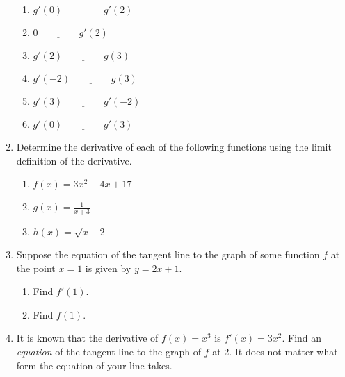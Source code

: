 \documentclass[11pt]{article}
\theoremstyle{definition}
\theoremstyle{definition}
\newcommand{\blank}{\underline{\ \ \ \ \ \ \ \ \ \ \ \ \ \ \ \ \ \ \ }}
\newcommand{\ds}{\displaystyle}
\begin{document}
\begin{enumerate}
\begin{multicols}{2}
\centering
{}
\begin{enumerate}
\item $g'(0)\blank g'(2)$
\bigskip
\item $0\blank g'(2)$
\bigskip
\item $g'(2)\blank g(3)$
\bigskip
\item $g'(-2)\blank g(3)$
\bigskip
\item $g'(3)\blank g'(-2)$
\bigskip
\item $g'(0)\blank g'(3)$
\end{enumerate}
\end{multicols}


\item Determine the derivative of each of the following functions using the limit definition of the derivative.
\begin{enumerate}
\item $f(x)=3x^2-4x+17$
\item $\ds g(x)=\frac{1}{x+3}$
\item $h(x)=\sqrt{x-2}$
\end{enumerate}

\item Suppose the equation of the tangent line to the graph of some function $f$ at the point $x=1$ is given by $y=2x+1$.
\begin{enumerate}
\item Find $f'(1)$.

\item Find $f(1)$.
\end{enumerate}

\item It is known that the derivative of $\ds f(x)=x^3$ is $\ds f'(x)=3x^2$. Find an \emph{equation} of the tangent line to the graph of $f$ at 2.  It does not matter what form the equation of your line takes.

\end{enumerate}
\end{document}
